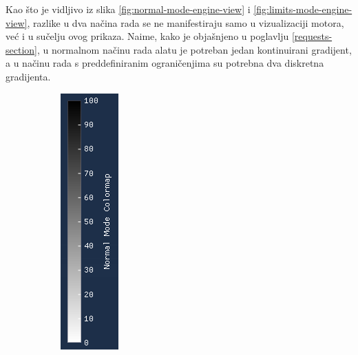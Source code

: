 \documentclass[times, utf8, diplomski]{fer}
\begin{document}
Kao što je vidljivo iz slika \ref{fig:normal-mode-engine-view} i \ref{fig:limits-mode-engine-view}, razlike u dva načina rada se ne manifestiraju samo u vizualizaciji motora, već i u sučelju ovog prikaza. Naime, kako je objašnjeno u poglavlju \ref{requests-section}, u normalnom načinu rada alatu je potreban jedan kontinuirani gradijent, a u načinu rada s preddefiniranim ograničenjima su potrebna dva diskretna gradijenta.
\begin{figure} [H]
     \centering
     \begin{subfigure}[h]{0.16\textwidth}
         \centering
         \includegraphics[width=\textwidth]{linear_colormap.png}

\end{subfigure}
\end{figure}
\end{document}
